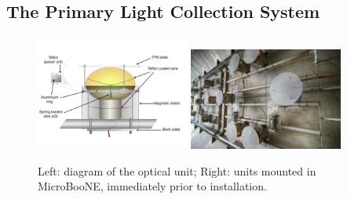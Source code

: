 
\subsection{The Primary Light Collection System}

\begin{figure}[t]
	\centering
           \includegraphics[width=0.45\textwidth]{./light_figures/PMTmount2.jpg} 
           \includegraphics[width=0.45\textwidth]{./light_figures/13-0430-05D.jpg} 
        \caption{Left: diagram of the optical unit; Right: units mounted in MicroBooNE, immediately prior to \lartpc installation.}\label{fig:unitmounted}
 
\end{figure}


